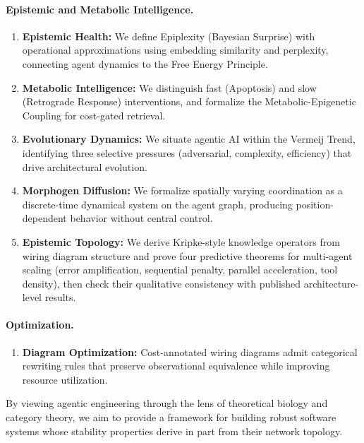 \paragraph{Epistemic and Metabolic Intelligence.}
\begin{enumerate}[leftmargin=*,resume]
\item \textbf{Epistemic Health:} We define Epiplexity (Bayesian Surprise) with operational approximations
using embedding similarity and perplexity, connecting agent dynamics to the Free Energy Principle.
\item \textbf{Metabolic Intelligence:} We distinguish fast (Apoptosis) and slow (Retrograde Response)
interventions, and formalize the Metabolic-Epigenetic Coupling for cost-gated retrieval.
\item \textbf{Evolutionary Dynamics:} We situate agentic AI within the Vermeij Trend, identifying three
selective pressures (adversarial, complexity, efficiency) that drive architectural evolution.
\item \textbf{Morphogen Diffusion:} We formalize spatially varying coordination as a discrete-time
dynamical system on the agent graph, producing position-dependent behavior without central control.
\item \textbf{Epistemic Topology:} We derive Kripke-style knowledge operators from wiring diagram
structure and prove four predictive theorems for multi-agent scaling (error amplification, sequential
penalty, parallel acceleration, tool density), then check their qualitative consistency with published architecture-level results.
\end{enumerate}

\paragraph{Optimization.}
\begin{enumerate}[leftmargin=*,resume]
\item \textbf{Diagram Optimization:} Cost-annotated wiring diagrams admit categorical rewriting
rules that preserve observational equivalence while improving resource utilization.
\end{enumerate}

By viewing agentic engineering through the lens of theoretical biology and category theory, we aim to provide a
framework for building robust software systems whose stability properties derive in part from their network topology.
